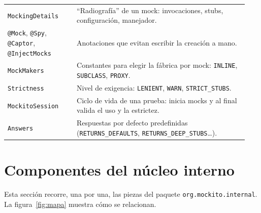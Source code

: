 \documentclass[11pt,a4paper,oneside]{report}
\newcommand{\code}[1]{\texttt{#1}}
\begin{document}
\begin{longtable}{p{0.27\linewidth}p{0.67\linewidth}}
\code{MockingDetails} & ``Radiografía'' de un mock: invocaciones, stubs, configuración, manejador.\\
\code{@Mock}, \code{@Spy}, \code{@Captor}, \code{@InjectMocks} & Anotaciones que evitan escribir la creación a mano.\\
\code{MockMakers} & Constantes para elegir la fábrica por mock: \code{INLINE}, \code{SUBCLASS}, \code{PROXY}.\\
\code{Strictness} & Nivel de exigencia: \code{LENIENT}, \code{WARN}, \code{STRICT\_STUBS}.\\
\code{MockitoSession} & Ciclo de vida de una prueba: inicia mocks y al final valida el uso y la estrictez.\\
\code{Answers} & Respuestas por defecto predefinidas (\code{RETURNS\_DEFAULTS}, \code{RETURNS\_DEEP\_STUBS}\ldots).\\
\bottomrule
\end{longtable}

\section{Componentes del núcleo interno}
Esta sección recorre, una por una, las piezas del paquete \code{org.mockito.internal}. La figura~\ref{fig:mapa} muestra cómo se relacionan.
\end{document}
